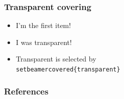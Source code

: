 \documentclass{beamer}
\begin{document}
\begin{frame}\frametitle{Transparent covering}
\begin{itemize}
\item{I'm the first item!}
\pause
\item{I was transparent!}
\pause
\item Transparent is selected by \texttt{\\setbeamercovered\{transparent\}}
\end{itemize}
\end{frame}

\begin{frame}[allowframebreaks]
\frametitle{References}

\end{frame}
\end{document}
